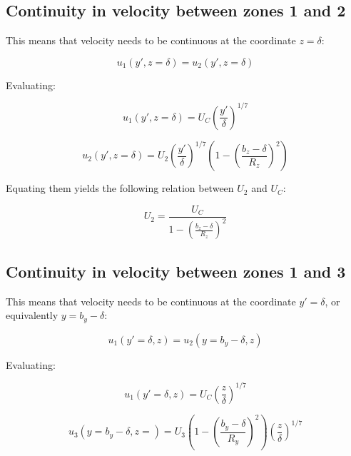 \subsection{Continuity in velocity between zones 1 and 2}

This means that velocity needs to be continuous at the coordinate $z = \delta$:

\begin{equation}
u_1 \left( y', z = \delta \right) = u_2 \left( y', z = \delta \right)
\end{equation}

Evaluating:

\begin{equation}
u_1 \left( y', z = \delta \right) = U_C \left( \frac{y'}{\delta} \right)^{1/7}
\end{equation}

\begin{equation}
u_2 \left( y', z = \delta \right) = U_2 \left( \frac{y'}{\delta} \right)^{1/7} \left( 1 - \left( \frac{b_z - \delta}{R_z} \right)^2 \right)
\end{equation}

Equating them yields the following relation between $U_2$ and $U_C$:

\begin{equation}
\label{eq:3D_BL_relation_Uc_U2}
\boxed{
U_2 = \frac{U_C}{1 - \left( \frac{b_z - \delta}{R_z} \right)^2 }
}
\end{equation}


\subsection{Continuity in velocity between zones 1 and 3}

This means that velocity needs to be continuous at the coordinate $y' = \delta$, or equivalently $y = b_y - \delta$:

\begin{equation}
u_1 \left( y' = \delta, z \right) = u_2 \left( y = b_y - \delta, z \right)
\end{equation}

Evaluating:

\begin{equation}
u_1 \left( y' = \delta, z \right) = U_C \left( \frac{z}{\delta} \right)^{1/7}
\end{equation}

\begin{equation}
u_3 \left( y = b_y - \delta, z = \right) = U_3 \left( 1 - \left( \frac{b_y - \delta}{R_y} \right)^2 \right) \left( \frac{z}{\delta} \right)^{1/7} 
\end{equation}

